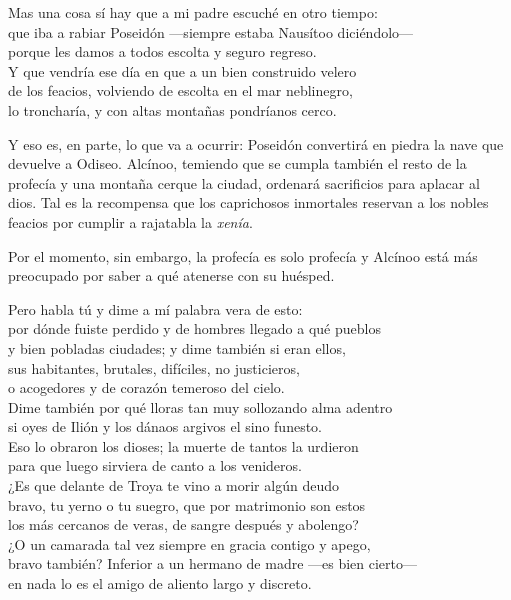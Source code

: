 \begin{versocita}
Mas una cosa sí hay que a mi padre escuché en otro tiempo:\\
que iba a rabiar Poseidón ---siempre estaba Nausítoo diciéndolo---\\
porque les damos a todos escolta y seguro regreso.\\
Y que vendría ese día en que a un bien construido velero\\
de los feacios, volviendo de escolta en el mar neblinegro,\\
lo troncharía, y con altas montañas pondríanos cerco.
\end{versocita}

Y eso es, en parte, lo que va a ocurrir: Poseidón convertirá en piedra la nave que devuelve a Odiseo. Alcínoo, temiendo que se cumpla también el resto de la profecía y una montaña cerque la ciudad, ordenará sacrificios para aplacar al dios. Tal es la recompensa que los caprichosos inmortales reservan a los nobles feacios por cumplir a rajatabla la \emph{xenía}.

Por el momento, sin embargo, la profecía es solo profecía y Alcínoo está más preocupado por saber a qué atenerse con su huésped.

\begin{versocita}
Pero habla tú y dime a mí palabra vera de esto:\\
por dónde fuiste perdido y de hombres llegado a qué pueblos\\
y bien pobladas ciudades; y dime también si eran ellos,\\
sus habitantes, brutales, difíciles, no justicieros,\\
o acogedores y de corazón temeroso del cielo.\\
\stanzabreak
Dime también por qué lloras tan muy sollozando alma adentro\\
si oyes de Ilión y los dánaos argivos el sino funesto.\\
Eso lo obraron los dioses; la muerte de tantos la urdieron\\
para que luego sirviera de canto a los venideros.\\
¿Es que delante de Troya te vino a morir algún deudo\\
bravo, tu yerno o tu suegro, que por matrimonio son estos\\
los más cercanos de veras, de sangre después y abolengo?\\
¿O un camarada tal vez siempre en gracia contigo y apego,\\
bravo también? Inferior a un hermano de madre ---es bien cierto---\\
en nada lo es el amigo de aliento largo y discreto.
\end{versocita}

